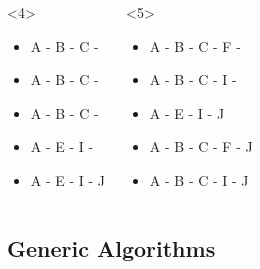 \begin{frame}[fragile]
\begin{columns}[t]
\begin{onlyenv}<4>
\begin{itemize}
\item A - B - C - 
\item A - B - C - 
\item A - B - C - 
\item A - E - I - 
\end{itemize}

\begin{itemize}
\item A - E - I - J
\end{itemize}
\end{onlyenv}

\begin{onlyenv}<5>
\begin{itemize}
\item A - B - C - F - 
\item A - B - C - I - 
\end{itemize}

\begin{itemize}
\item A - E - I - J
\item  A - B - C - F - J
\item  A - B - C - I - J
\end{itemize}
\end{onlyenv}


\end{columns}

\end{frame}


\subsection{Generic Algorithms}


